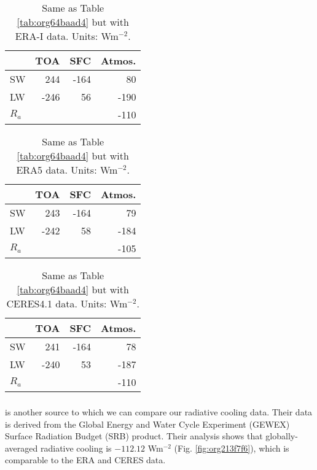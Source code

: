 \documentclass[11pt]{article}
\begin{document}
\begin{table}[htbp]
\caption{\label{tab:org4d3e2b8}Same as Table \ref{tab:org64baad4} but with ERA-I data. Units: Wm\(^{-2}\).}
\centering
\begin{tabular}{lrrr}
\hline
 & TOA & SFC & Atmos.\\
\hline
SW & 244 & -164 & 80\\
LW & -246 & 56 & -190\\
\hline
\(R_a\) &  &  & -110\\
\hline
\end{tabular}
\end{table}

\begin{table}[htbp]
\caption{\label{tab:org6fa0a98}Same as Table \ref{tab:org64baad4} but with ERA5 data. Units: Wm\(^{-2}\).}
\centering
\begin{tabular}{lrrr}
\hline
 & TOA & SFC & Atmos.\\
\hline
SW & 243 & -164 & 79\\
LW & -242 & 58 & -184\\
\hline
\(R_a\) &  &  & -105\\
\hline
\end{tabular}
\end{table}

\begin{table}[htbp]
\caption{\label{tab:org8748e47}Same as Table \ref{tab:org64baad4} but with CERES4.1 data. Units: Wm\(^{-2}\).}
\centering
\begin{tabular}{lrrr}
\hline
 & TOA & SFC & Atmos.\\
\hline
SW & 241 & -164 & 78\\
LW & -240 & 53 & -187\\
\hline
\(R_a\) &  &  & -110\\
\hline
\end{tabular}
\end{table}

\subsubsection{\cite{lin_assessment_2008}}
\label{sec:org1d53cf8}
\cite{lin_assessment_2008} is another source to which we can compare our radiative cooling data. Their data is derived from the Global Energy and Water Cycle Experiment (GEWEX) Surface Radiation Budget (SRB) product. Their analysis shows that globally-averaged radiative cooling is \(-112.12\) Wm\(^{-2}\) (Fig. \ref{fig:org213f7f6}), which is comparable to the ERA and CERES data.
\end{document}
